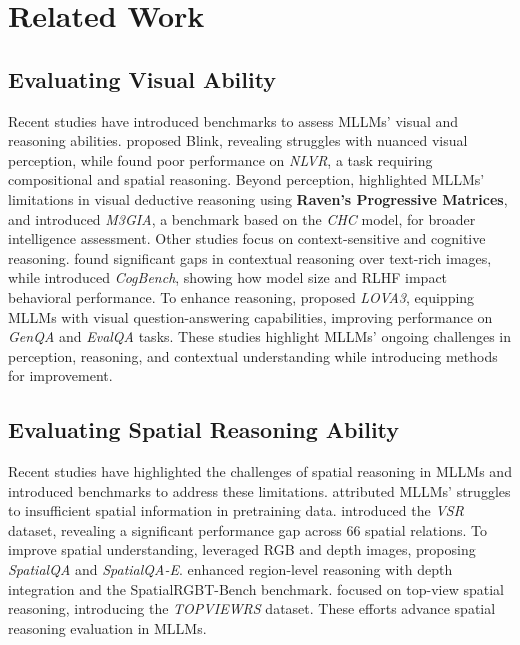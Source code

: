 \section{Related Work}

\subsection{Evaluating Visual Ability}

Recent studies have introduced benchmarks to assess MLLMs' visual and reasoning abilities.
\citet{fu2024blink} proposed Blink, revealing struggles with nuanced visual perception, while \citet{wu2024surprising} found poor performance on \textit{NLVR}, a task requiring compositional and spatial reasoning.
Beyond perception, \citet{zhang2024far} highlighted MLLMs' limitations in visual deductive reasoning using \textbf{Raven's Progressive Matrices}, and \citet{song2024m3gia} introduced \textit{M3GIA}, a benchmark based on the \textit{CHC} model, for broader intelligence assessment.
Other studies focus on context-sensitive and cognitive reasoning.
\citet{wadhawan2024contextual} found significant gaps in contextual reasoning over text-rich images, while \citet{coda2024cogbench} introduced \textit{CogBench}, showing how model size and RLHF impact behavioral performance.
To enhance reasoning, \citet{zhao2024lova3} proposed \textit{LOVA3}, equipping MLLMs with visual question-answering capabilities, improving performance on \textit{GenQA} and \textit{EvalQA} tasks.
These studies highlight MLLMs' ongoing challenges in perception, reasoning, and contextual understanding while introducing methods for improvement.

\subsection{Evaluating Spatial Reasoning Ability}

Recent studies have highlighted the challenges of spatial reasoning in MLLMs and introduced benchmarks to address these limitations.
\citet{kamath2023s} attributed MLLMs' struggles to insufficient spatial information in pretraining data.
\citet{liu2023visual} introduced the \textit{VSR} dataset, revealing a significant performance gap across 66 spatial relations.
To improve spatial understanding, \citet{cai2024spatialbot} leveraged RGB and depth images, proposing \textit{SpatialQA} and \textit{SpatialQA-E}.
\citet{cheng2024spatialrgpt} enhanced region-level reasoning with depth integration and the SpatialRGBT-Bench benchmark.
\citet{li2024topviewrs} focused on top-view spatial reasoning, introducing the \textit{TOPVIEWRS} dataset.
These efforts advance spatial reasoning evaluation in MLLMs.

